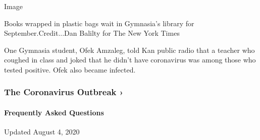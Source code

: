 Image

Books wrapped in plastic bags wait in Gymnasia's library for
September.Credit...Dan Balilty for The New York Times

One Gymnasia student, Ofek Amzaleg, told Kan public radio that a teacher
who coughed in class and joked that he didn't have coronavirus was among
those who tested positive. Ofek also became infected.

\href{https://www.nytimes3xbfgragh.onion/news-event/coronavirus?action=click\&pgtype=Article\&state=default\&region=MAIN_CONTENT_3\&context=storylines_faq}{}

\hypertarget{the-coronavirus-outbreak-}{%
\subsubsection{The Coronavirus Outbreak
›}\label{the-coronavirus-outbreak-}}

\hypertarget{frequently-asked-questions}{%
\paragraph{Frequently Asked
Questions}\label{frequently-asked-questions}}

Updated August 4, 2020

